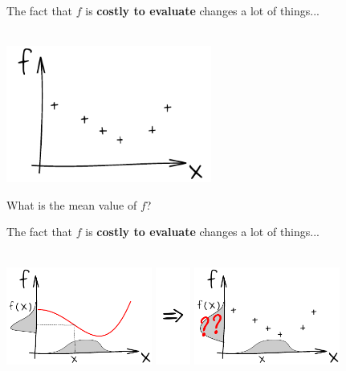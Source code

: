 \documentclass{beamer}
\begin{document}
\begin{frame}{}
The fact that $f$ is \textbf{costly to evaluate} changes a lot of things...\\
\vspace{5mm}
\\
\vspace{5mm}
\begin{center}
\includegraphics[height=4.5cm]{figures/ink_fX}
\end{center}
What is the mean value of $f$?
\end{frame}

\begin{frame}{}
The fact that $f$ is \textbf{costly to evaluate} changes a lot of things...\\
\vspace{5mm}
\\
\vspace{5mm}
\begin{center}
\includegraphics[height=3.2cm]{figures/ink_unprogf} \includegraphics[height=3.2cm]{figures/Rightarrow} \includegraphics[height=3.2cm]{figures/ink_unprogfX}
\end{center}
\end{frame}
\end{document}
